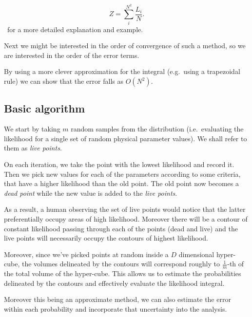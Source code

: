 \documentclass[11pt, reprint]{revtex4-2}
\begin{document}
\begin{equation}
  Z = \sum_i^{N^{2}} \frac{L_i}{N}.
\end{equation}\cite[See][]{skilling2006}~for a more detailed explanation and example.

Next we might be interested in the order of convergence of such a
method, so we are interested in the order of the error terms.

By using a more clever approximation for the
integral\cite{skilling2006} (e.g.~using a trapezoidal rule) we can
show that the error falls as \( O ( N^2 ) \).


\subsection{Basic algorithm}\label{sec-4-1}

We start by taking \( m \) random samples from the distribution
(i.e.~evaluating the likelihood for a single set of random physical
parameter values). We shall refer to them as \emph{live points}.

On each iteration, we take the point with the lowest likelihood and
record it. Then we pick new values for each of the parameters
according to some criteria, that have a higher likelihood than the
old point. The old point now becomes a \emph{dead point} while the new
value is added to the \emph{live points}.

As a result, a human observing the set of live points would notice
that the latter preferentially occupy areas of high
likelihood. Moreover there will be a contour of constant likelihood
passing through each of the points (dead and live) and the live points
will necessarily occupy the contours of highest likelihood.

Moreover, since we've picked points at random inside a \(D\)
dimensional hyper-cube, the volumes delineated by the contours will
correspond roughly to \( \frac{1}{m} \)-th of the total volume of the
hyper-cube. This allows us to estimate the probabilities delineated by
the contours and effectively evaluate the likelihood integral.

Moreover this being an approximate method, we can also estimate the
error within each probability and incorporate that uncertainty into
the analysis.
\end{document}
